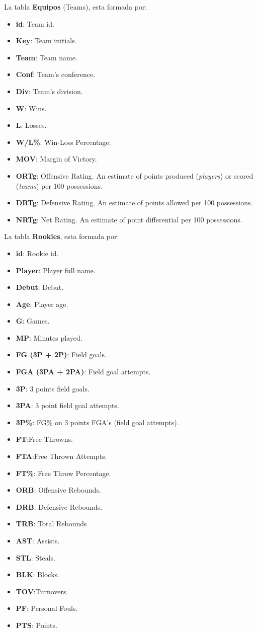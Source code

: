 \documentclass[11pt]{diazessay} %
\begin{document}
La tabla \textbf{Equipos} (Teams), esta formada por:
\begin{itemize}
	\item \textbf{id}: Team id.
	\item \textbf{Key}: Team initials.
	\item \textbf{Team}: Team name.
	\item \textbf{Conf}: Team's conference.
	\item \textbf{Div}: Team's division.
	\item \textbf{W}: Wins.
	\item \textbf{L}: Losses.
	\item \textbf{W/L\%}: Win-Loss Percentage.
	\item \textbf{MOV}: Margin of Victory.
	\item\textbf{ORTg}: Offensive Rating. An estimate of points produced (\textit{players}) or scored (\textit{teams}) per 100 possessions.
	\item\textbf{DRTg}: Defensive Rating. An estimate of points allowed per 100 possessions.
	\item\textbf{NRTg}: Net Rating. An estimate of point differential per 100 possessions.
\end{itemize}

La tabla \textbf{Rookies}, esta formada por:
\begin{itemize}
	\item \textbf{id}: Rookie id.
	\item \textbf{Player}: Player full name.
	\item \textbf{Debut}: Debut.
	\item \textbf{Age}: Player age.
	\item \textbf{G}: Games.
	\item \textbf{MP}: Minutes played.
	\item \textbf{FG (3P + 2P)}: Field goals.
	\item \textbf{FGA (3PA + 2PA)}: Field goal attempts.
	\item \textbf{3P}: 3 points field goals.
	\item \textbf{3PA}: 3 point field goal attempts.
	\item \textbf{3P\%}: FG\% on 3 points FGA's (field goal attempts).
	\item \textbf{FT}:Free Throwns.
	\item \textbf{FTA}:Free Thrown Attempts.
	\item \textbf{FT\%}: Free Throw Percentage.
	\item\textbf{ORB}: Offensive Rebounds.
	\item\textbf{DRB}: Defensive Rebounds.
	\item\textbf{TRB}: Total Rebounds
	\item\textbf{AST}: Assists.
	\item\textbf{STL}: Steals.
	\item\textbf{BLK}: Blocks.
	\item\textbf{TOV}:Turnovers.
	\item\textbf{PF}: Personal Fouls.
	\item\textbf{PTS}: Points.
\end{itemize}
\end{document}
